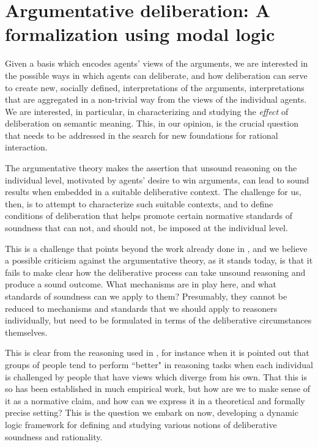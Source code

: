\documentclass[greybox]{svmult}
\begin{document}
\section{Argumentative deliberation: A formalization using modal logic}\label{sec:ddl}

Given a basis which encodes agents' views of the arguments, we are interested in the possible ways in which agents can deliberate, and how deliberation can serve to create new, socially defined, interpretations of the arguments, interpretations that are aggregated in a non-trivial way from the views of the individual agents.  We are interested, in particular, in characterizing and studying the \emph{effect} of deliberation on semantic meaning. This, in our opinion, is the crucial question that needs to be addressed in the search for new foundations for rational interaction.

The argumentative theory makes the assertion that unsound reasoning on the individual level, motivated by agents' desire to win arguments, can lead to sound results when embedded in a suitable deliberative context. The challenge for us, then, is to attempt to characterize such suitable contexts, and to define conditions of deliberation that helps promote certain normative standards of soundness that can not, and should not, be imposed at the individual level. 

This is a challenge that points beyond the work already done in \cite{mercier}, and we believe a possible criticism against the argumentative theory, as it stands today, is that it fails to make clear how the deliberative process can take unsound reasoning and produce a sound outcome.  What mechanisms are in play here, and what standards of soundness can we apply to them? Presumably, they cannot be reduced to mechanisms and standards that we should apply to reasoners individually, but need to be formulated in terms of the deliberative circumstances themselves.

This is clear from the reasoning used in \cite{mercier}, for instance when it is pointed out that groups of people tend to perform ``better" in reasoning tasks when each individual is challenged by people that have views which diverge from his own. That this is so has been established in much empirical work, but how are we to make sense of it as a normative claim, and how can we express it in a theoretical and formally precise setting? This is the question we embark on now, developing a dynamic logic framework for defining and studying various notions of deliberative soundness and rationality.
\end{document}
